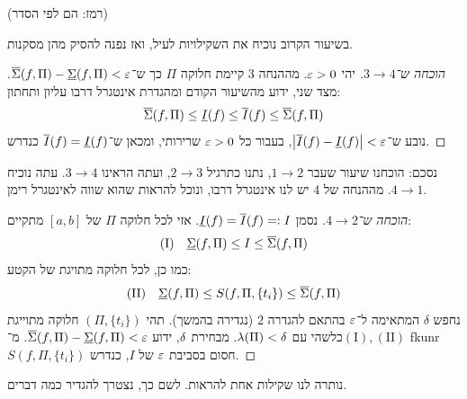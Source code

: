 \documentclass[]{../../../../tex/classes/styledArticle}
\begin{document}
	(רמז: הם לפי הסדר)
	
	בשיעור הקרוב נוכיח את השקילויות לעיל, ואז נפנה להסיק מהן מסקנות. 

	
	\begin{proof}[הוכחה ש־$3 \to 4$]
		יהי $\eg > 0$. מההנחה $3$ קיימת חלוקה $\Pi$ כך ש־$\daru(f, \Pi) - \dard(f, \Pi) < \eg$. מצד שני, ידוע מהשיעור הקודם ומהגדרת אינטגרל דרבו עליון ותחתון: 
		\[ \overline{\Sigma}(f, \Pi) \le \underline{I}(f) \le \overline{I}(f) \le \overline{\Sigma}(f, \Pi) \]
		נובע ש־$\sof{\Idaru(f) - \Idard(f)} < \eg$, בעבור כל $\eg > 0$ שרירותי, ומכאן ש־$\overline{I}(f)=\underline{I}(f)$ כנדרש. 
	\end{proof}
	
	נסכם: הוכחנו שיעור שעבר $1 \to 2$, נתנו כתרגיל $2 \to 3$, ועתה הראינו $3 \to 4$. עתה נוכיח $4 \to 1$. מההנחה של 4 יש לנו אינטגרל דרבו, ונוכל להראות שהוא שווה לאינטגרל רימן. 
	
	\begin{proof}[הוכחה ש־$4 \to 2$]
		נסמן $\underline{I}(f) = \overline{I}(f) =: I$. אזי לכל חלוקה $\Pi$ של $[a, b]$ מתקיים: 
		\[ (\mathrm{I}) \quad \underline{\Sigma}(f, \Pi) \le I \le \overline{\Sigma}(f, \Pi) \]
		כמו כן, לכל חלוקה מתויגת של הקטע: 
		\[ (\mathrm{II})\quad \underline{\Sigma}(f, \Pi) \le S(f, \Pi, \{t_i\}) \le \overline{\Sigma}(f, \Pi) \]
		נחפש $\delta$ המתאימה ל־$\eg$ בהתאם להגדרה $2$ (נגדירה בהמשך). תהי $(\Pi, \{t_i\})$ חלוקה מתוייגת כלשהי עם $\lambda(\Pi) < \delta$. מבחירת $\delta$, ידוע $\daru(f, \Pi) - \dard(f, \Pi) < \eg$. מ־$(\mathrm{I}), (\mathrm{II})$ fkunr 
		$S(f, \Pi, \{t_i\})$ חסום בסביבת $\eg$ של $I$, כנדרש. 
	\end{proof}
	נותרה לנו שקילות אחת להראות. לשם כך, נצטרך להגדיר כמה דברים. 
	
	
	
	
	
\end{document}
